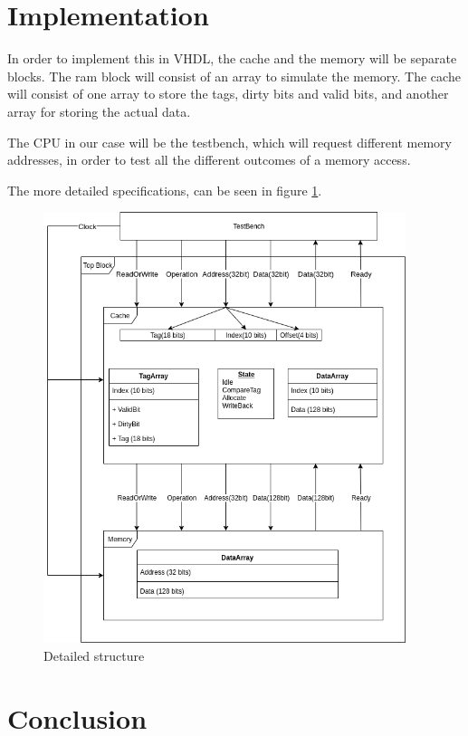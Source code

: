 \documentclass{article}
\begin{document}
\section{Implementation}

In order to implement this in VHDL, the cache and the memory will be separate blocks. The ram block will consist of an array to simulate the memory. The cache will consist of one array to store the tags, dirty bits and valid bits, and another array for storing the actual data. 

The CPU in our case will be the testbench, which will request different memory addresses, in order to test all the different outcomes of a memory access. 

The more detailed specifications, can be seen in figure \ref{DETAILED}.

\begin{figure}[H]
 \centering
  \includegraphics[width=300pt]{img/OverviewDetailed.png}
 \caption{Detailed structure}
  \label{DETAILED}
 \end{figure}




\section{Conclusion}
\end{document}
